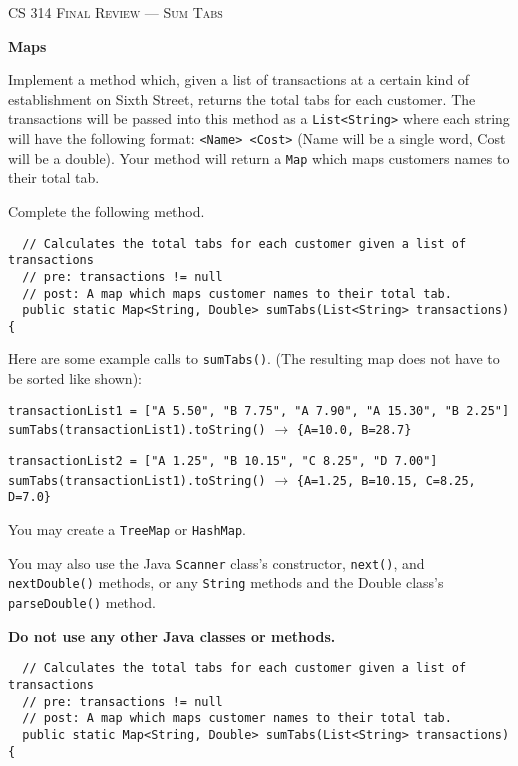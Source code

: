 \documentclass[12pt,letter]{article}
\begin{document}
\noindent\textsc{\large CS 314 Final Review --- Sum Tabs}

\vspace{6pt}
\noindent\textbf{Maps}

\vspace{2pt}
\noindent Implement a method which, given a list of transactions at a certain kind of establishment on Sixth Street,
returns the total tabs for each customer. The transactions will be passed into this method as a \texttt{List<String>} where
each string will have the following format: \texttt{<Name> <Cost>} (Name will be a single word, Cost will be a double). 
Your method will return a \texttt{Map} which maps customers names to their total tab.

\vspace{4pt}
\noindent Complete the following method.
\begin{verbatim}
  // Calculates the total tabs for each customer given a list of transactions
  // pre: transactions != null
  // post: A map which maps customer names to their total tab.
  public static Map<String, Double> sumTabs(List<String> transactions) {
\end{verbatim}

\vspace{4pt}
\noindent Here are some example calls to \texttt{sumTabs()}. (The resulting map does not have to be sorted like shown):
\newline

\noindent \texttt{transactionList1 = ["A 5.50", "B 7.75", "A 7.90", "A 15.30", "B 2.25"]} \newline
\noindent \texttt{sumTabs(transactionList1).toString()} $\rightarrow$ \texttt{\{A=10.0, B=28.7\}} \newline

\noindent \texttt{transactionList2 = ["A 1.25", "B 10.15", "C 8.25", "D 7.00"]} \newline
\noindent \texttt{sumTabs(transactionList1).toString()} $\rightarrow$ \texttt{\{A=1.25, B=10.15, C=8.25, D=7.0\}} \newline

\noindent You may create a \texttt{TreeMap} or \texttt{HashMap}. 

\noindent You may also use the Java \texttt{Scanner} class's constructor, \texttt{next()}, and \texttt{nextDouble()} methods,
or any \texttt{String} methods and the Double class's \texttt{parseDouble()} method. \newline

\noindent \textbf{Do not use any other Java classes or methods.}

\clearpage
\begin{verbatim}
  // Calculates the total tabs for each customer given a list of transactions
  // pre: transactions != null
  // post: A map which maps customer names to their total tab.
  public static Map<String, Double> sumTabs(List<String> transactions) {

\end{verbatim}
\end{document}
